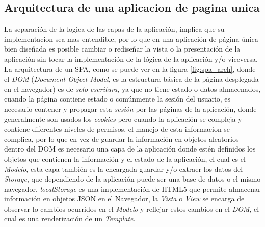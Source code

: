 



\subsection{Arquitectura de una aplicacion de pagina unica}


La separación de la logica de las capas de la aplicación, implica que su implementacion sea mas entendible, por lo que en una aplicación de página única bien diseñada es posible cambiar o rediseñar la vista o la presentación de la aplicación sin tocar la implementación de la lógica de la aplicación y/o viceversa.\\

La arquitectura de un SPA, como se puede ver en la figura \ref{fig:spa_arch}, donde el \emph{DOM} (\emph{Document Object Model}, es la estructura básica de la página desplegada en el navegador) es de \emph{solo escritura}, ya que no tiene estado o datos almacenados, cuando la página contiene estado o comúnmente la sesión del usuario, es necesario contener y propagar esta \emph{sesión} por las páginas de la aplicación, donde generalmente son usados los \emph{cookies} pero cuando la aplicación se compleja y contiene diferentes niveles de permisos, el manejo de esta informacion se complica, por lo que en vez de guardar la información en objetos aleatorios dentro del DOM es necesario una capa de la aplicación donde estén definidos los objetos que contienen la información y el estado de la aplicación, el cual es el \emph{Modelo}, esta capa también es la encargada guardar y/o extraer los datos del \emph{Storage}, que dependiendo de la aplicación puede ser una base de datos o el mismo navegador, \emph{localStorage} es una implementación de HTML5 que permite almacenar información en objetos JSON en el Navegador, la \emph{Vista} o \emph{View} se encarga de observar lo cambios ocurridos en el \emph{Modelo} y reflejar estos cambios en el \emph{DOM}, el cual es una renderización de un \emph{Template}.\\

